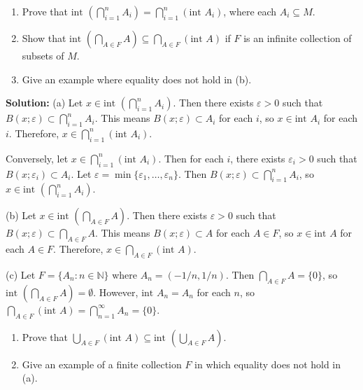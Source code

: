 \begin{problembox}
\begin{enumerate}[label=\alph*)]
\item Prove that \(\text{int } \left(\bigcap_{i=1}^n A_i\right) = \bigcap_{i=1}^n (\text{int } A_i)\), where each \( A_i \subseteq M \).
\item Show that \(\text{int } \left(\bigcap_{A \in F} A\right) \subseteq \bigcap_{A \in F} (\text{int } A)\) if \( F \) is an infinite collection of subsets of \( M \).
\item Give an example where equality does not hold in (b).
\end{enumerate}
\end{problembox}

\textbf{Solution:} 
(a) Let $x \in \text{int }(\bigcap_{i=1}^n A_i)$. Then there exists $\varepsilon > 0$ such that $B(x;\varepsilon) \subset \bigcap_{i=1}^n A_i$. This means $B(x;\varepsilon) \subset A_i$ for each $i$, so $x \in \text{int } A_i$ for each $i$. Therefore, $x \in \bigcap_{i=1}^n (\text{int } A_i)$.

Conversely, let $x \in \bigcap_{i=1}^n (\text{int } A_i)$. Then for each $i$, there exists $\varepsilon_i > 0$ such that $B(x;\varepsilon_i) \subset A_i$. Let $\varepsilon = \min\{\varepsilon_1, \ldots, \varepsilon_n\}$. Then $B(x;\varepsilon) \subset \bigcap_{i=1}^n A_i$, so $x \in \text{int }(\bigcap_{i=1}^n A_i)$.

(b) Let $x \in \text{int }(\bigcap_{A \in F} A)$. Then there exists $\varepsilon > 0$ such that $B(x;\varepsilon) \subset \bigcap_{A \in F} A$. This means $B(x;\varepsilon) \subset A$ for each $A \in F$, so $x \in \text{int } A$ for each $A \in F$. Therefore, $x \in \bigcap_{A \in F} (\text{int } A)$.

(c) Let $F = \{A_n : n \in \mathbb{N}\}$ where $A_n = (-1/n, 1/n)$. Then $\bigcap_{A \in F} A = \{0\}$, so $\text{int }(\bigcap_{A \in F} A) = \emptyset$. However, $\text{int } A_n = A_n$ for each $n$, so $\bigcap_{A \in F} (\text{int } A) = \bigcap_{n=1}^{\infty} A_n = \{0\}$.

\begin{problembox}
\begin{enumerate}[label=\alph*)]
\item Prove that \(\bigcup_{A \in F} (\text{int } A) \subseteq \text{int } \left(\bigcup_{A \in F} A\right)\).
\item Give an example of a finite collection \( F \) in which equality does not hold in (a).
\end{enumerate}
\end{problembox}

